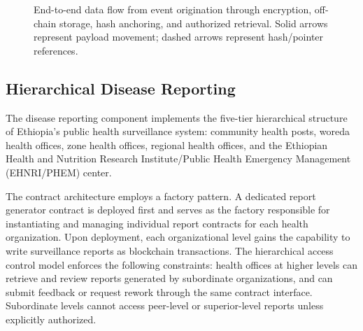 \documentclass[AMA,LATO1COL]{WileyNJD-v2}
\begin{document}
\begin{figure}[!ht]
\centering
{}
\caption{End-to-end data flow from event origination through encryption, off-chain storage, hash anchoring, and authorized retrieval. Solid arrows represent payload movement; dashed arrows represent hash/pointer references.}\label{fig:web3}
\end{figure}
%
%

\subsection{Hierarchical Disease Reporting}\label{subsec:reporting}

The disease reporting component implements the five-tier hierarchical structure of Ethiopia's public health surveillance system: community health posts, woreda health offices, zone health offices, regional health offices, and the Ethiopian Health and Nutrition Research Institute/Public Health Emergency Management (EHNRI/PHEM) center.

The contract architecture employs a factory pattern. A dedicated report generator contract is deployed first and serves as the factory responsible for instantiating and managing individual report contracts for each health organization. Upon deployment, each organizational level gains the capability to write surveillance reports as blockchain transactions. The hierarchical access control model enforces the following constraints: health offices at higher levels can retrieve and review reports generated by subordinate organizations, and can submit feedback or request rework through the same contract interface. Subordinate levels cannot access peer-level or superior-level reports unless explicitly authorized.
\end{document}
